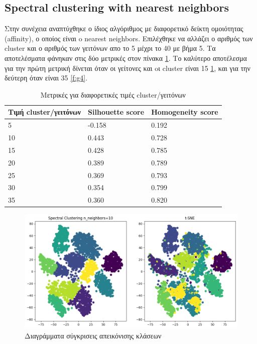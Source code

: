 \clearpage

\subsection{Spectral clustering with nearest neighbors}

Στην συνέχεια αναπτύχθηκε ο ίδιος αλγόριθμος με διαφορετικό δείκτη ομοιότητας (affinity), ο οποίος είναι o nearest neighbors. Επιλέχθηκε να αλλάζει ο αριθμός των cluster και ο αριθμός των γειτόνων απο το 5 μέχρι το 40 με βήμα 5. Τα αποτελέσματα φάνηκαν στις δύο μετρικές στον πίνακα \ref{tab:abc}. Το καλύτερο αποτέλεσμα για την πρώτη μετρική δίνεται όταν οι γείτονες και oι cluster είναι 15 \ref{f:g3}, και για την δεύτερη όταν είναι 35 \ref{f:g4}.

\begin{table}[ht]
	\centering
	\caption{Μετρικές για διαφορετικές τιμές cluster/γειτόνων}
	\begin{tabular}{l | l | l}
		Τιμή cluster/γειτόνων & Silhouette score &  Homogeneity score\\
		\hline
		5 & -0.158 & 0.192\\
		10 & 0.443 & 0.728\\
		15 & 0.428&0.785\\
		20 & 0.389 & 0.789\\
		25 &0.369 & 0.793\\
		30 & 0.354 & 0.799\\
		35 & 0.360 & 0.820\\
	\end{tabular}
	
	\label{tab:abc}
\end{table}
\begin{figure}[ht]
	\centering
	\includegraphics[width=1\linewidth]{Imagedata1/n_15tsne.png}
	\caption{ Διαγράμματα σύγκρισεις απεικόνισης κλάσεων }
	\label{f:g3}	
\end{figure}
